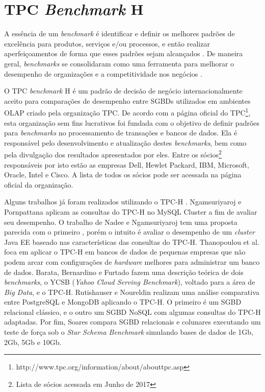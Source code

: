 \chapter{TPC \textit{Benchmark} H}
\label{tpch}

A essência de um \textit{benchmark} é identificar e definir os melhores padrões de excelência para produtos, serviços e/ou processos, e então realizar aperfeiçoamentos de forma que esses padrões sejam alcançados \cite{bhutta1999benchmarking}. De maneira geral, \textit{benchmarks} se consolidaram como uma ferramenta para melhorar o desempenho de organizações e a competitividade nos negócios \cite{kyro2003revising}.

O TPC \textit{\textit{benchmark}} H é um padrão de decisão de negócio internacionalmente aceito para comparações de desempenho entre SGBDs utilizados em ambientes OLAP criado pela organização TPC. De acordo com a página oficial do TPC\footnote{http://www.tpc.org/information/about/abouttpc.asp}, esta organização sem fins lucrativos foi fundada com o objetivo de definir padrões para \textit{benchmarks} no processamento de transações e bancos de dados. Ela é responsável pelo desenvolvimento e atualização destes \textit{benchmarks}, bem como pela divulgação dos resultados apresentados por eles. Entre os sócios\footnote{Lista de sócios acessada em Junho de 2017} responsáveis por isto estão as empresas Dell, Hewlet Packard, IBM, Microsoft, Oracle, Intel e Cisco. A lista de todos os sócios pode ser acessada na página oficial da organização.

Alguns trabalhos já foram realizados utilizando o TPC-H \cite{ngamsuriyaroj2010performance, nadee2012performance, thanopoulou2012benchmarking, barata2014ycsb, rutishauser2012tpc, soares2012avaliaccao}. Ngamsuriyaroj e Pornpattana \cite{ngamsuriyaroj2010performance} aplicam as consultas do TPC-H no MySQL Cluster a fim de avaliar seu desempenho. O trabalho de Nadee e Ngamsuriyaroj \cite{nadee2012performance} tem uma proposta parecida com o primeiro \cite{ngamsuriyaroj2010performance}, porém o intuito é avaliar o desempenho de um \textit{cluster} Java EE baseado nas características das consultas do TPC-H. Thanopoulou et al. \cite{thanopoulou2012benchmarking} foca em aplicar o TPC-H em bancos de dados de pequenas empresas que não podem arcar com configurações de \textit{hardware} melhores para administrar um banco de dados. Barata, Bernardino e Furtado \cite{barata2014ycsb} fazem uma descrição teórica de dois \textit{benchmarks}, o YCSB (\textit{Yahoo Cloud Serving Benchmark}), voltado para a área de \textit{Big Data}, e o TPC-H. Rutishauser e Noureldin \cite{rutishauser2012tpc} realizam uma análise comparativa entre PostgreSQL e MongoDB aplicando o TPC-H. O primeiro é um SGBD relacional clássico, e o outro um SGBD NoSQL com algumas consultas do TPC-H adaptadas. Por fim, Soares \cite{soares2012avaliaccao} compara SGBD relacionais e colunares executando um teste de força sob o \textit{Star Schema Benchmark} simulando bases de dados de 1Gb, 2Gb, 5Gb e 10Gb.

